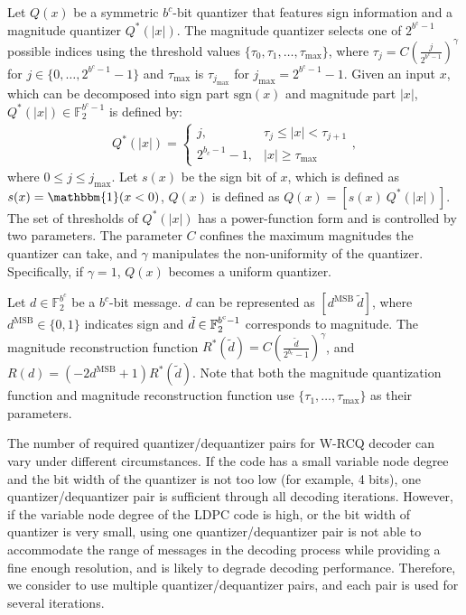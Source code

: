 \documentclass [PhD] {uclathes}
\begin{document}
Let $Q(x)$ be a symmetric $b^c$-bit quantizer that features sign information and a magnitude quantizer $Q^*(|x|)$. The magnitude quantizer selects one of $2^{b^\text{c}-1}$ possible indices using the threshold values $\{\tau_0,\tau_1,\ldots,\tau_{\text{max}}\}$, where  $\tau_j=C\left(\frac{j}{2^{b^c-1}}\right)^{\gamma}$ for $j\in\{0,\ldots,2^{b^{c}-1}-1\}$ and $\tau_{\text{max}}$ is $\tau_{j_{\text{max}}}$ for $j_{\text{max}} = 2^{b^\text{c}-1}-1$.
Given an input $x$, which can be decomposed into sign part ${{\mathrm{sgn}}(x)}$ and magnitude part $|x|$, $Q^*(|x|)\in \mathbb{F}_2^{b^{\mathrm{c}}-1}$ is defined by:
\begin{align}
    {Q}^*(|x|)=\left\{\begin{matrix}
  j, &    \tau_j\leq|x|<\tau_{j+1}\\
  2^{b_c-1}-1, & |x|\geq \tau_{\mathrm{max}} 
 \end{matrix}\right.,
 \label{equ: 10}
 \end{align}
 where $0\leq j\le j_{\text{max}}$. Let $s(x)$ be the sign bit of $x$, which is defined as $s(x)=\mathbbm{1}(x<0)$, $Q(x)$ is defined as
$Q(x)=[s(x)~Q^*(|x|)]$. The set of thresholds of $Q^*(|x|)$ has a power-function form and is controlled by two parameters. The parameter $C$ confines the maximum magnitudes the quantizer can take, and $\gamma$ manipulates the non-uniformity of the quantizer. 
Specifically, if $\gamma=1$,  $Q(x)$ becomes a uniform quantizer.

Let $d\in\mathbb{F}_2^{b^c}$ be a $b^c$-bit message. $d$ can be represented as $[d^{\text{MSB}}\ \tilde{d}]$, where $d^{\text{MSB}}\in\{0,1\}$ indicates sign and $\Tilde{d}\in\mathbb{F}_2^{b^\text{c}-1}$ corresponds to magnitude. The magnitude reconstruction function ${R}^*(\tilde{d}) = C\left(\frac{\tilde{d}}{2^{b_c}-1}\right)^{\gamma}$,
and $R(d)=(-2d^{\mathrm{MSB}}+1)R^*(\tilde{d})$. Note that both the magnitude quantization function and magnitude reconstruction function use  $\{\tau_1,\ldots,\tau_{\text{max}}\}$ as their parameters. 

The number of  required quantizer/dequantizer pairs for W-RCQ decoder can vary under different circumstances. If the code has a small variable node degree and the bit width of the quantizer is not too low (for example, 4 bits), one quantizer/dequantizer pair is sufficient through all decoding iterations. However, if the variable node degree of the LDPC code is high, or the bit width of quantizer is very small, using one quantizer/dequantizer pair is not able to accommodate the range of messages in the decoding process while providing a fine enough resolution, and is likely to degrade decoding performance. Therefore, we consider to use multiple quantizer/dequantizer pairs, and each pair is used for several iterations.
\end{document}
